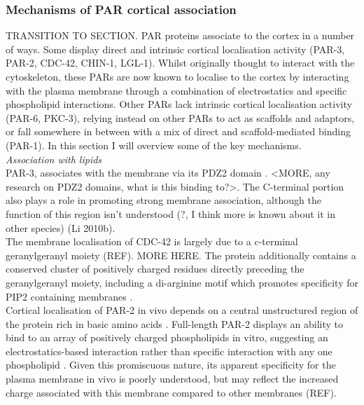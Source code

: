 \documentclass[12pt]{"article"}
\begin{document}
\subsubsection{Mechanisms of PAR cortical association}

TRANSITION TO SECTION. PAR proteins associate to the cortex in a number of ways. Some display direct and intrinsic cortical localisation activity (PAR-3, PAR-2, CDC-42, CHIN-1, LGL-1). Whilst originally thought to interact with the cytoskeleton, these PARs are now known to localise to the cortex by interacting with the plasma membrane through a combination of electrostatics and specific phospholipid interactions. Other PARs lack intrinsic cortical localisation activity (PAR-6, PKC-3), relying instead on other PARs to act as scaffolds and adaptors, or fall somewhere in between with a mix of direct and scaffold-mediated binding (PAR-1). In this section I will overview some of the key mechanisms.\\


\textit{Association with lipids}\\


PAR-3, associates with the membrane via its PDZ2 domain \parencite{Li2010a}. <MORE, any research on PDZ2 domains, what is this binding to?>.  The C-terminal portion also plays a role in promoting strong membrane association, although the function of this region isn’t understood (?, I think more is known about it in other species) (Li 2010b). \\

The membrane localisation of CDC-42 is largely due to a c-terminal geranylgeranyl moiety (REF). MORE HERE. The protein additionally contains a conserved cluster of positively charged residues directly preceding the geranylgeranyl moiety, including a di-arginine motif which promotes specificity for PIP2 containing membranes \parencite{Johnson2012}.\\

Cortical localisation of PAR-2 in vivo depends on a central unstructured region of the protein rich in basic amino acids \parencite{Hao2006}. Full-length PAR-2 displays an ability to bind to an array of positively charged phospholipids in vitro, suggesting an electrostatics-based interaction rather than specific interaction with any one phospholipid \parencite{Motegi2011}. Given this promiscuous nature, its apparent specificity for the plasma membrane in vivo is poorly understood, but may reflect the increased charge associated with this membrane compared to other membranes (REF).\\
\end{document}
